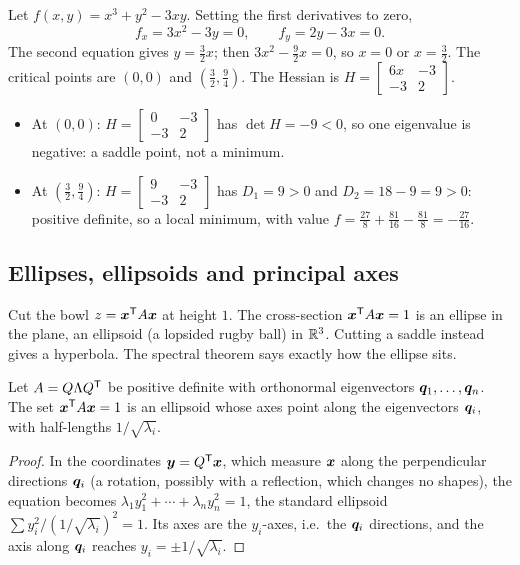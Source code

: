 \begin{example}\label{ex:u31-critical}
Let $f(x,y)=x^3+y^2-3xy$. Setting the first derivatives to zero,
\[
  f_x=3x^2-3y=0,\qquad f_y=2y-3x=0 .
\]
The second equation gives $y=\tfrac32x$; then $3x^2-\tfrac92x=0$, so $x=0$ or $x=\tfrac32$. The
critical points are $(0,0)$ and $(\tfrac32,\tfrac94)$. The Hessian is
$H=\left[\begin{smallmatrix}6x&-3\\-3&2\end{smallmatrix}\right]$.
\begin{itemize}
  \item At $(0,0)$: $H=\left[\begin{smallmatrix}0&-3\\-3&2\end{smallmatrix}\right]$ has
        $\det H=-9<0$, so one eigenvalue is negative: a saddle point, not a minimum.
  \item At $(\tfrac32,\tfrac94)$: $H=\left[\begin{smallmatrix}9&-3\\-3&2\end{smallmatrix}\right]$ has
        $D_1=9>0$ and $D_2=18-9=9>0$: positive definite, so a local minimum, with value
        $f=\tfrac{27}{8}+\tfrac{81}{16}-\tfrac{81}{8}=-\tfrac{27}{16}$.
\end{itemize}
\end{example}

\subsection{Ellipses, ellipsoids and principal axes}

Cut the bowl $z=\boldsymbol{x}^{\mathsf{T}} A\boldsymbol{x}$ at height $1$. The cross-section $\boldsymbol{x}^{\mathsf{T}} A\boldsymbol{x}=1$ is an ellipse in the plane,
an ellipsoid (a lopsided rugby ball) in $\mathbb{R}^3$. Cutting a saddle instead gives a hyperbola. The
spectral theorem says exactly how the ellipse sits.

\begin{theorem}\label{thm:u31-axes}
Let $A=Q\Lambda Q^{\mathsf{T}}$ be positive definite with orthonormal eigenvectors $\boldsymbol{q}_1,\dots,\boldsymbol{q}_n$. The
set $\boldsymbol{x}^{\mathsf{T}} A\boldsymbol{x}=1$ is an ellipsoid whose axes point along the eigenvectors $\boldsymbol{q}_i$, with
half-lengths $1/\sqrt{\lambda_i}$.
\end{theorem}
\begin{proof}
In the coordinates $\boldsymbol{y}=Q^{\mathsf{T}}\boldsymbol{x}$, which measure $\boldsymbol{x}$ along the perpendicular directions
$\boldsymbol{q}_i$ (a rotation, possibly with a reflection, which changes no shapes), the equation becomes
$\lambda_1y_1^2+\cdots+\lambda_ny_n^2=1$, the standard ellipsoid
$\sum y_i^2/(1/\sqrt{\lambda_i})^2=1$. Its axes are the $y_i$-axes, i.e.\ the $\boldsymbol{q}_i$ directions,
and the axis along $\boldsymbol{q}_i$ reaches $y_i=\pm1/\sqrt{\lambda_i}$.
\end{proof}


